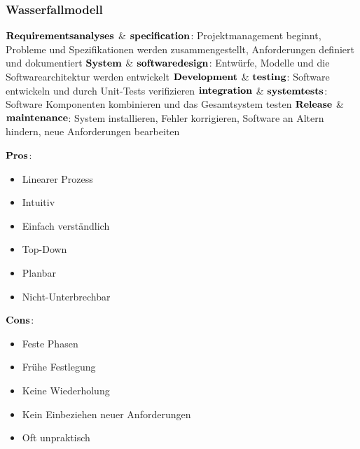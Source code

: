 \subsubsection{Wasserfallmodell}
\begin{table}[H]
\end{table}
$\bold{Requirements analyses}$ \& $\bold{specification}$: Projektmanagement beginnt, Probleme und Spezifikationen werden zusammengestellt, Anforderungen definiert und dokumentiert \newline
$\bold{System}$ \& $\bold{software design}$: Entwürfe, Modelle und die Softwarearchitektur werden entwickelt \newline
$\bold{Development}$ \& $\bold{testing}$: Software entwickeln und durch Unit-Tests verifizieren \newline
$\bold{integration}$ \& $\bold{system tests}$: Software Komponenten kombinieren und das Gesamtsystem testen \newline
$\bold{Release}$ \& $\bold{maintenance}$: System installieren, Fehler korrigieren, Software an Altern hindern, neue Anforderungen bearbeiten 
\begin{multicols}{2}
$\bold{Pros}$:
\begin{itemize}
	\item Linearer Prozess
	\item Intuitiv
	\item Einfach verständlich
	\item Top-Down
	\item Planbar
	\item Nicht-Unterbrechbar
\end{itemize}
\columnbreak
$\bold{Cons}$:
\begin{itemize}
	\item Feste Phasen
	\item Frühe Festlegung
	\item Keine Wiederholung
	\item Kein Einbeziehen neuer Anforderungen
	\item Oft unpraktisch
\end{itemize}
\end{multicols}
